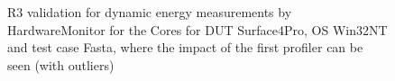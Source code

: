 \begin{figure}
                            \caption{R3 validation for dynamic energy measurements by HardwareMonitor for the Cores for DUT Surface4Pro, OS Win32NT and test case Fasta, where the impact of the first profiler can be seen (with outliers)} \label{fig:Surface4Pro_HardwareMonitor_Cores_R3_dynamic_energy_with_outliers_Win32NT_avg_watts}
                            \end{figure}
                            